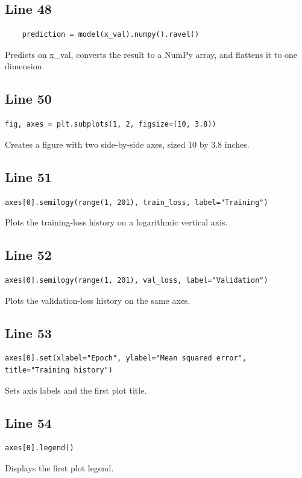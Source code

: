 \documentclass[11pt,a4paper]{article}
\begin{document}
\subsection*{Line 48}
\begin{lstlisting}
    prediction = model(x_val).numpy().ravel()
\end{lstlisting}
Predicts on x\_val, converts the result to a NumPy array, and flattens it to one dimension.

\subsection*{Line 50}
\begin{lstlisting}
fig, axes = plt.subplots(1, 2, figsize=(10, 3.8))
\end{lstlisting}
Creates a figure with two side-by-side axes, sized 10 by 3.8 inches.

\subsection*{Line 51}
\begin{lstlisting}
axes[0].semilogy(range(1, 201), train_loss, label="Training")
\end{lstlisting}
Plots the training-loss history on a logarithmic vertical axis.

\subsection*{Line 52}
\begin{lstlisting}
axes[0].semilogy(range(1, 201), val_loss, label="Validation")
\end{lstlisting}
Plots the validation-loss history on the same axes.

\subsection*{Line 53}
\begin{lstlisting}
axes[0].set(xlabel="Epoch", ylabel="Mean squared error", title="Training history")
\end{lstlisting}
Sets axis labels and the first plot title.

\subsection*{Line 54}
\begin{lstlisting}
axes[0].legend()
\end{lstlisting}
Displays the first plot legend.
\end{document}
